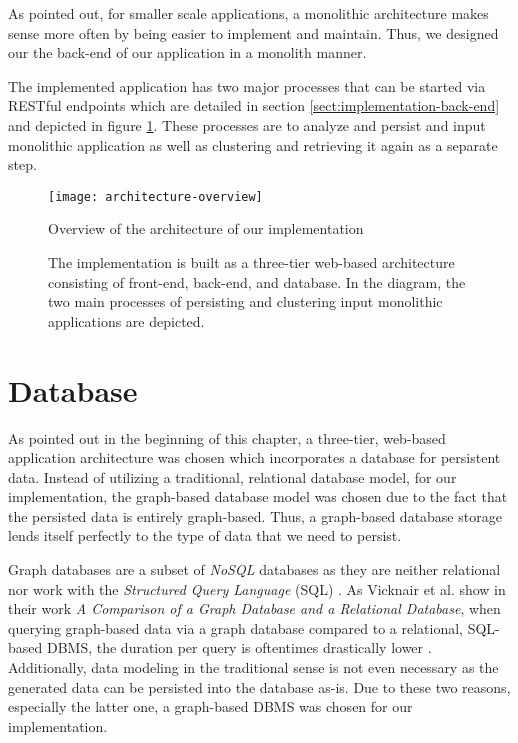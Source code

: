 \documentclass[12pt,a4paper]{report}
\begin{document}
As pointed out, for smaller scale applications, a monolithic architecture
makes sense more often by being easier to implement and maintain.
Thus, we designed our the back-end of our application in a monolith manner.

The implemented application has two major processes that can be started
via RESTful endpoints which are detailed in section \ref{sect:implementation-back-end}
and depicted in figure \ref{fig:architecture-overview}.
These processes are to analyze and persist and input monolithic application
as well as clustering and retrieving it again as a separate step.

\begin{figure}[htbp]
\centering
\texttt{[image: architecture-overview]}
\caption{Overview of the architecture of our implementation}
\caption*{
    The implementation is built as a three-tier web-based architecture consisting of
    front-end, back-end, and database. In the diagram, the two main processes of
    persisting and clustering input monolithic applications are depicted.
}
\label{fig:architecture-overview}
\end{figure}



\section{Database} \label{sect:implementation-database}

As pointed out in the beginning of this chapter, a three-tier, web-based
application architecture was chosen which incorporates a database
for persistent data.
Instead of utilizing a traditional, relational database model,
for our implementation, the graph-based database model was chosen
due to the fact that the persisted data is entirely graph-based.
Thus, a graph-based database storage lends itself perfectly to the
type of data that we need to persist.

Graph databases are a subset of \textit{NoSQL} databases as they are
neither relational nor work with the \textit{Structured Query Language} (SQL)
\cite{vicknair2010graphdatabase}.
As Vicknair et al. show in their work \textit{A Comparison of a
Graph Database and a Relational Database}, when querying graph-based
data via a graph database compared to a relational, SQL-based DBMS,
the duration per query is oftentimes drastically lower
\cite{vicknair2010graphdatabase}.
Additionally, data modeling in the traditional sense is not even
necessary as the generated data can be persisted into the database as-is.
Due to these two reasons, especially the latter one, a graph-based DBMS
was chosen for our implementation.
\end{document}
